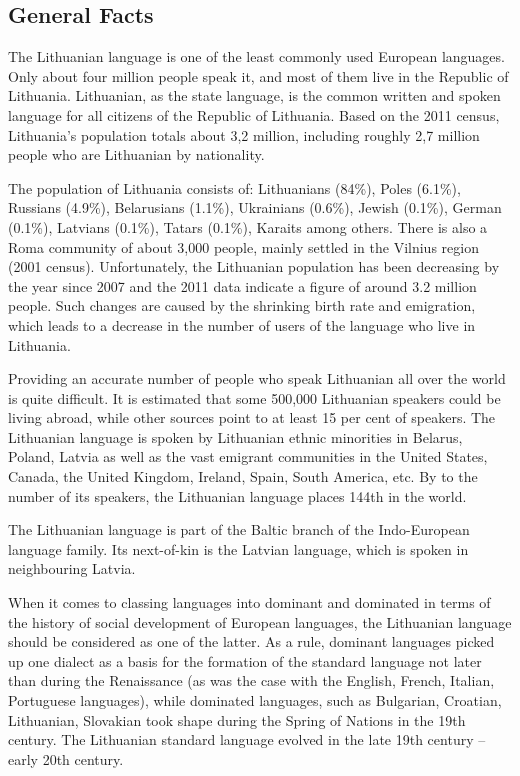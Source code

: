 \begin{multicols}{2}

\subsection{General Facts}

The Lithuanian language is one of the least commonly used European languages. Only about four million people speak it, and most of them live in the Republic of Lithuania. Lithuanian, as the state language, is the common written and spoken language for all citizens of the Republic of Lithuania. Based on the 2011 census, Lithuania’s population totals about 3,2 million, including roughly 2,7 million people who are Lithuanian by nationality. 

   The population of Lithuania consists of: Lithuanians (84\%), Poles (6.1\%), Russians (4.9\%), Belarusians (1.1\%), Ukrainians (0.6\%), Jewish (0.1\%), German (0.1\%), Latvians (0.1\%), Tatars (0.1\%), Karaits among others.  There is also a Roma community of about 3,000 people, mainly settled in the Vilnius region (2001 census). Unfortunately, the Lithuanian population has been decreasing by the year since 2007 and the 2011 data indicate a figure of around 3.2 million people. Such changes are caused by the shrinking birth rate and emigration, which leads to a decrease in the number of users of the language who live in Lithuania.

    Providing an accurate number of people who speak Lithuanian all over the world is quite difficult. It is estimated that some 500,000 Lithuanian speakers could be living abroad, while other sources point to at least 15 per cent of speakers. The Lithuanian language is spoken by Lithuanian ethnic minorities in Belarus, Poland, Latvia as well as the vast emigrant communities in the United States, Canada, the United Kingdom, Ireland, Spain, South America, etc. By to the number of its speakers, the Lithuanian language places 144th in the world.


The Lithuanian language is part of the Baltic branch of the Indo-European language family. Its next-of-kin is the Latvian language, which is spoken in neighbouring Latvia.

    When it comes to classing languages into dominant and dominated in terms of the history of social development of European languages, the Lithuanian language should be considered as one of the latter. As a rule, dominant languages picked up one dialect as a basis for the formation of the standard language not later than during the Renaissance (as was the case with the English, French, Italian, Portuguese languages), while dominated languages, such as Bulgarian, Croatian, Lithuanian, Slovakian took shape during the Spring of Nations in the 19th century. The Lithuanian standard language evolved in the late 19th century – early 20th century.


\end{multicols}
